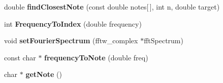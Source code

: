 \begin{DoxyCompactItemize}
\item 
\hypertarget{classVocoder_a0bc26c9977b46623e3c3fc3bc733ed24}{double {\bfseries find\-Closest\-Note} (const double notes\mbox{[}$\,$\mbox{]}, int n, double target)}\label{classVocoder_a0bc26c9977b46623e3c3fc3bc733ed24}

\item 
\hypertarget{classVocoder_aae99cff1d3e7fc029433998dc7fd0381}{int {\bfseries Frequency\-To\-Index} (double frequency)}\label{classVocoder_aae99cff1d3e7fc029433998dc7fd0381}

\item 
\hypertarget{classVocoder_a223d77b73ef3b2fa8be406e46f671441}{void {\bfseries set\-Fourier\-Spectrum} (fftw\-\_\-complex $\ast$fft\-Spectrum)}\label{classVocoder_a223d77b73ef3b2fa8be406e46f671441}

\item 
\hypertarget{classVocoder_a4fd5417891ffeb5668dc9c52478c2428}{const char $\ast$ {\bfseries frequency\-To\-Note} (double freq)}\label{classVocoder_a4fd5417891ffeb5668dc9c52478c2428}

\item 
\hypertarget{classVocoder_aee9e5b1265e55d99488164f4a9527d65}{char $\ast$ {\bfseries get\-Note} ()}\label{classVocoder_aee9e5b1265e55d99488164f4a9527d65}

\end{DoxyCompactItemize}
